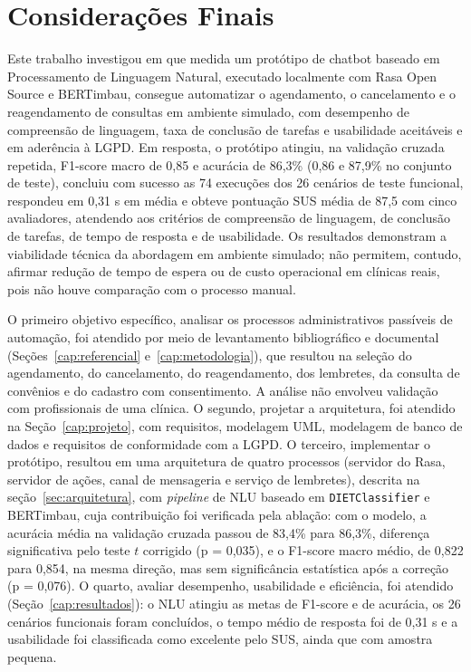 \documentclass[12pt,a4paper]{extarticle}
\begin{document}
\newpage
\section{Considerações Finais}
\label{cap:conclusao}

Este trabalho investigou em que medida um protótipo de chatbot baseado em Processamento de Linguagem Natural, executado localmente com Rasa Open Source e BERTimbau, consegue automatizar o agendamento, o cancelamento e o reagendamento de consultas em ambiente simulado, com desempenho de compreensão de linguagem, taxa de conclusão de tarefas e usabilidade aceitáveis e em aderência à LGPD. Em resposta, o protótipo atingiu, na validação cruzada repetida, F1-score macro de 0,85 e acurácia de 86,3\% (0,86 e 87,9\% no conjunto de teste), concluiu com sucesso as 74 execuções dos 26 cenários de teste funcional, respondeu em 0,31 s em média e obteve pontuação SUS média de 87,5 com cinco avaliadores, atendendo aos critérios de compreensão de linguagem, de conclusão de tarefas, de tempo de resposta e de usabilidade. Os resultados demonstram a viabilidade técnica da abordagem em ambiente simulado; não permitem, contudo, afirmar redução de tempo de espera ou de custo operacional em clínicas reais, pois não houve comparação com o processo manual.

O primeiro objetivo específico, analisar os processos administrativos passíveis de automação, foi atendido por meio de levantamento bibliográfico e documental (Seções~\ref{cap:referencial} e~\ref{cap:metodologia}), que resultou na seleção do agendamento, do cancelamento, do reagendamento, dos lembretes, da consulta de convênios e do cadastro com consentimento. A análise não envolveu validação com profissionais de uma clínica. O segundo, projetar a arquitetura, foi atendido na Seção~\ref{cap:projeto}, com requisitos, modelagem UML, modelagem de banco de dados e requisitos de conformidade com a LGPD. O terceiro, implementar o protótipo, resultou em uma arquitetura de quatro processos (servidor do Rasa, servidor de ações, canal de mensageria e serviço de lembretes), descrita na seção~\ref{sec:arquitetura}, com \textit{pipeline} de NLU baseado em \texttt{DIETClassifier} e BERTimbau, cuja contribuição foi verificada pela ablação: com o modelo, a acurácia média na validação cruzada passou de 83,4\% para 86,3\%, diferença significativa pelo teste $t$ corrigido (p = 0,035), e o F1-score macro médio, de 0,822 para 0,854, na mesma direção, mas sem significância estatística após a correção (p = 0,076). O quarto, avaliar desempenho, usabilidade e eficiência, foi atendido (Seção~\ref{cap:resultados}): o NLU atingiu as metas de F1-score e de acurácia, os 26 cenários funcionais foram concluídos, o tempo médio de resposta foi de 0,31 s e a usabilidade foi classificada como excelente pelo SUS, ainda que com amostra pequena.
\end{document}
